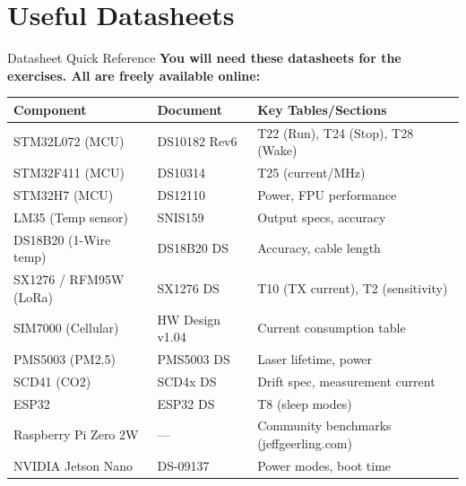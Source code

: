 \documentclass[aspectratio=169,11pt]{beamer}
\begin{document}
\section{Useful Datasheets}

\begin{frame}{Datasheet Quick Reference}
    \textbf{You will need these datasheets for the exercises. All are freely available online:}
    
    \vspace{0.3cm}
    \footnotesize
    \begin{center}
    \begin{tabular}{lll}
        \toprule
        \textbf{Component} & \textbf{Document} & \textbf{Key Tables/Sections} \\
        \midrule
        STM32L072 (MCU) & DS10182 Rev6 & T22 (Run), T24 (Stop), T28 (Wake) \\
        STM32F411 (MCU) & DS10314 & T25 (current/MHz) \\
        STM32H7 (MCU) & DS12110 & Power, FPU performance \\
        LM35 (Temp sensor) & SNIS159 & Output specs, accuracy \\
        DS18B20 (1-Wire temp) & DS18B20 DS & Accuracy, cable length \\
        SX1276 / RFM95W (LoRa) & SX1276 DS & T10 (TX current), T2 (sensitivity) \\
        SIM7000 (Cellular) & HW Design v1.04 & Current consumption table \\
        PMS5003 (PM2.5) & PMS5003 DS & Laser lifetime, power \\
        SCD41 (CO2) & SCD4x DS & Drift spec, measurement current \\
        ESP32 & ESP32 DS & T8 (sleep modes) \\
        Raspberry Pi Zero 2W & --- & Community benchmarks (jeffgeerling.com) \\
        NVIDIA Jetson Nano & DS-09137 & Power modes, boot time \\
        \bottomrule
    \end{tabular}
    \end{center}
    \normalsize
\end{frame}
\end{document}

